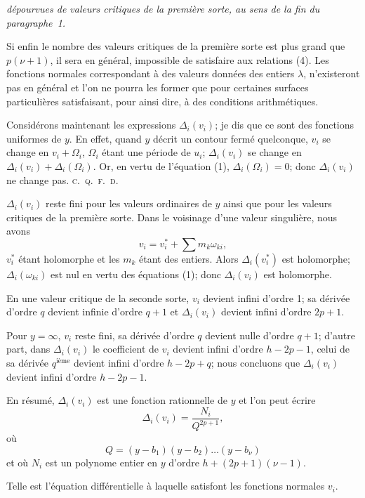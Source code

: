 \documentclass{article}
\begin{document}
\emph{dépourvues de valeurs critiques de la première sorte, au sens de la fin du paragraphe~1.}

Si enfin le nombre des valeurs critiques de la première sorte est plus grand que $p(\nu + 1)$, il sera en général, impossible de satisfaire aux relations (4). Les fonctions normales correspondant à des valeurs données des entiers $\lambda$, n'existeront pas en général et l'on ne pourra les former que pour certaines surfaces particulières satisfaisant, pour ainsi dire, à des conditions arithmétiques.

Considérons maintenant les expressions $\Delta_{i}(v_{i})$; je dis que ce sont des fonctions uniformes de $y$. En effet, quand $y$ décrit un contour fermé quelconque, $v_{i}$ se change en $v_{i} + \Omega_{i}$, $\Omega_{i}$ étant une période de $u_{i}$; $\Delta_{i}(v_{i})$ se change en $\Delta_{i}(v_{i}) + \Delta_{i}(\Omega_{i})$. Or, en vertu de l'équation (1), $\Delta_{i}(\Omega_{i}) = 0$; donc $\Delta_{i}(v_{i})$ ne change pas. \hfill\textsc{c.~q.~f.~d.}

$\Delta_{i}(v_{i})$ reste fini pour les valeurs ordinaires de $y$ ainsi que pour les valeurs critiques de la première sorte. Dans le voisinage d'une valeur singulière, nous avons
\[
v_{i} = v_{i}^{*} + \sum m_{k} \omega_{ki},
\]
$v_{i}^{*}$ étant holomorphe et les $m_{k}$ étant des entiers. Alors $\Delta_{i}(v_{i}^{*})$ est holomorphe; $\Delta_{i}(\omega_{ki})$ est nul en vertu des équations (1); donc $\Delta_{i}(v_{i})$ est holomorphe.

En une valeur critique de la seconde sorte, $v_{i}$ devient infini d'ordre 1; sa dérivée d'ordre $q$ devient infinie d'ordre $q+1$ et $\Delta_{i}(v_{i})$ devient infini d'ordre $2p+1$.

Pour $y = \infty$, $v_{i}$ reste fini, sa dérivée d'ordre $q$ devient nulle d'ordre $q+1$; d'autre part, dans $\Delta_{i}(v_{i})$ le coefficient de $v_{i}$ devient infini d'ordre $h - 2p - 1$, celui de sa dérivée $q^{\text{ième}}$ devient infini d'ordre $h - 2p + q$; nous concluons que $\Delta_{i}(v_{i})$ devient infini d'ordre $h - 2p - 1$.

En résumé, $\Delta_{i}(v_{i})$ est une fonction rationnelle de $y$ et l'on peut écrire
\[
\Delta_{i}(v_{i}) = \frac{N_{i}}{Q^{2p+1}}, \tag{5}
\]
où
\[
Q = (y - b_{1})(y - b_{2})\ldots (y - b_{\nu})
\]
et où $N_{i}$ est un polynome entier en $y$ d'ordre $h + (2p+1)(\nu - 1)$.

Telle est l'équation différentielle à laquelle satisfont les fonctions normales $v_{i}$.
\end{document}
